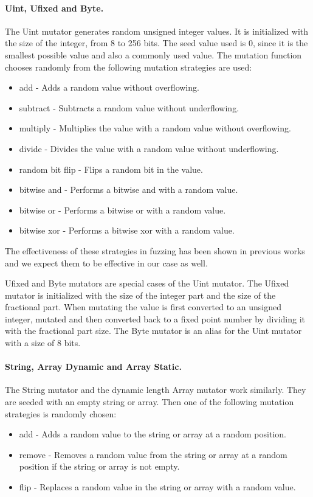 \paragraph{Uint, Ufixed and Byte.}
The Uint mutator generates random unsigned integer values. It is initialized with the size of the integer, from 8 to 256 bits. The seed value used is 0, since it is the smallest possible value and also a commonly used value. The mutation function chooses randomly from the following mutation strategies are used:
\begin{itemize}
    \item add - Adds a random value without overflowing.
    \item subtract - Subtracts a random value without underflowing.
    \item multiply - Multiplies the value with a random value without overflowing.
    \item divide - Divides the value with a random value without underflowing.
    \item random bit flip - Flips a random bit in the value.
    \item bitwise and - Performs a bitwise and with a random value.
    \item bitwise or - Performs a bitwise or with a random value.
    \item bitwise xor - Performs a bitwise xor with a random value.
\end{itemize}
The effectiveness of these strategies in fuzzing has been shown in previous works \cite{michal_zalewski_binary_2014} and we expect them to be effective in our case as well.

Ufixed and Byte mutators are special cases of the Uint mutator. The Ufixed mutator is initialized with the size of the integer part and the size of the fractional part. When mutating the value is first converted to an unsigned integer, mutated and then converted back to a fixed point number by dividing it with the fractional part size. The Byte mutator is an alias for the Uint mutator with a size of 8 bits.

\paragraph{String, Array Dynamic and Array Static.}
The String mutator and the dynamic length Array mutator work similarly. They are seeded with an empty string or array. Then one of the following mutation strategies is randomly chosen:
\begin{itemize}
    \item add - Adds a random value to the string or array at a random position.
    \item remove - Removes a random value from the string or array at a random position if the string or array is not empty.
    \item flip - Replaces a random value in the string or array with a random value.
\end{itemize}


